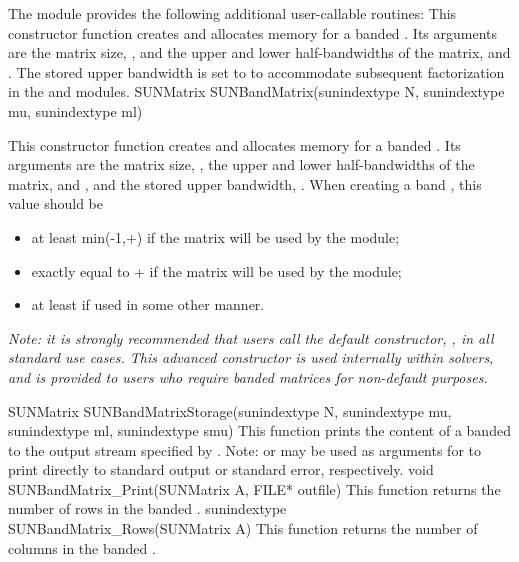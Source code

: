 The module {\sunmatband} provides the following additional user-callable routines:
{
  This constructor function creates and allocates memory for a banded .
  Its arguments are the matrix size, , and the upper and lower
  half-bandwidths of the matrix,  and .  The stored
  upper bandwidth is set to  to accommodate subsequent
  factorization in the {\sunlinsolband} and {\sunlinsollapband} modules.
}
{
  SUNMatrix SUNBandMatrix(sunindextype N, sunindextype mu,
  sunindextype ml)
}
{
  This constructor function creates and allocates memory for a banded .
  Its arguments are the matrix size, , the upper and lower
  half-bandwidths of the matrix,  and , and the stored
  upper bandwidth, .  When creating a band ,
  this value should be
  \begin{itemize}
  \item at least min(-1,+) if the matrix will be
    used by the {\sunlinsolband} module;
  \item exactly equal to + if the matrix will be used by
    the {\sunlinsollapband} module;
  \item at least  if used in some other manner.
  \end{itemize}
  \emph{Note: it is strongly recommended that users call the default
    constructor, , in all standard use cases.  This
    advanced constructor is used internally within {\sundials}
    solvers, and is provided to users who require banded matrices for
    non-default purposes.}
}
{
  SUNMatrix SUNBandMatrixStorage(sunindextype N, sunindextype mu,
  sunindextype ml, sunindextype smu)
}
{
  This function prints the content of a banded  to the
  output stream specified by .  Note: 
  or  may be used as arguments for  to print
  directly to standard output or standard error, respectively.
}
{
  void SUNBandMatrix\_Print(SUNMatrix A, FILE* outfile)
}
{
  This function returns the number of rows in the banded .
}
{
  sunindextype SUNBandMatrix\_Rows(SUNMatrix A)
}
{
  This function returns the number of columns in the banded .
}
